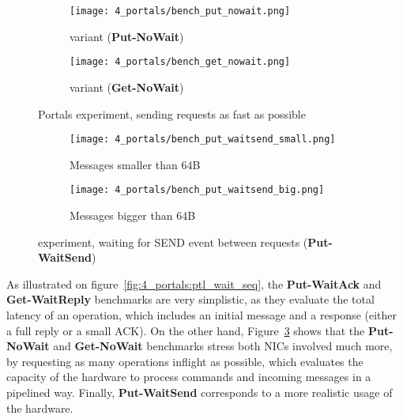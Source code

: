 \begin{figure}[!h]
    \centering
    \begin{subfigure}{.5\textwidth}
        \centering
        \texttt{[image: 4\_portals/bench\_put\_nowait.png]}
        \caption{ variant (\textbf{Put-NoWait})}
        \label{fig:4_portals:ptlput_nowait_seq}
    \end{subfigure}%
    \begin{subfigure}{.5\textwidth}
        \centering
        \texttt{[image: 4\_portals/bench\_get\_nowait.png]}
        \caption{ variant (\textbf{Get-NoWait})}
        \label{fig:4_portals:ptlget_nowait_seq}
    \end{subfigure}
    \caption{Portals experiment, sending requests as fast as possible}
    \label{fig:4_portals:ptl_nowait_seq}
\end{figure}

\begin{figure}[!h]
    \centering
    \begin{subfigure}{.5\textwidth}
        \centering
        \texttt{[image: 4\_portals/bench\_put\_waitsend\_small.png]}
        \caption{Messages smaller than 64B}
        \label{fig:4_portals:ptlput_waitsend_small_seq}
    \end{subfigure}%
    \begin{subfigure}{.5\textwidth}
        \centering
        \texttt{[image: 4\_portals/bench\_put\_waitsend\_big.png]}
        \caption{Messages bigger than 64B}
        \label{fig:4_portals:ptlput_waitsend_big_seq}
    \end{subfigure}
    \caption{ experiment, waiting for SEND event between requests (\textbf{Put-WaitSend})}
    \label{fig:4_portals:ptlput_waitsend_seq}
\end{figure}

As illustrated on figure~\ref{fig:4_portals:ptl_wait_seq}, the
\textbf{Put-WaitAck} and \textbf{Get-WaitReply} benchmarks are very simplistic,
as they evaluate the total latency of an operation, which includes an initial
message and a response (either a full reply or a small ACK). On the other hand,
Figure~\ref{fig:4_portals:ptl_nowait_seq} shows that the \textbf{Put-NoWait} and
\textbf{Get-NoWait} benchmarks stress both NICs involved much more, by
requesting as many operations inflight as possible, which evaluates the capacity
of the hardware to process commands and incoming messages in a pipelined way.
Finally, \textbf{Put-WaitSend} corresponds to a more realistic usage of the
hardware.

